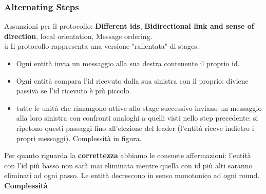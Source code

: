 \documentclass[12pt]{article}
\begin{document}
		\subsubsection{Alternating Steps}
			Assunzioni per il protocollo: \textbf{Different ids}, \textbf{Bidirectional link and sense of direction}, local orientation, Message ordering.\\ù
			Il protocollo rappresenta una versione "rallentata" di stages.
			\begin{itemize}
				\item Ogni entità invia un messaggio alla sua destra contenente il proprio id.
				\item Ogni entità compara l'id ricevuto dalla sua sinistra con il proprio: diviene passiva se l'id ricevuto è più piccolo.
				\item tutte le unità che rimangono attive allo stage successivo inviano un messaggio alla loro sinistra con confronti analoghi a quelli visti nello step precedente: si ripetono questi passaggi fino all'elezione del leader (l'entità riceve indietro i propri messaggi). Complessità in figura.
			\end{itemize}
			Per quanto riguarda la \textbf{correttezza} abbiamo le consuete affermazioni: l'entità con l'id più basso non sarà mai eliminata mentre quella con id più alti saranno eliminati ad ogni passo. Le entità decrescono in senso monotonico ad ogni round. \\
			\textbf{Complessità}
			
\end{document}
